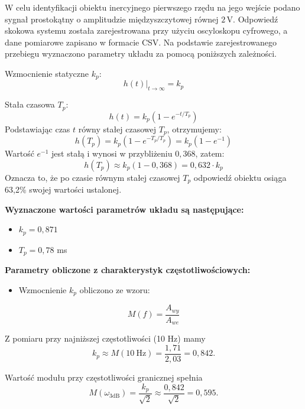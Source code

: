 \documentclass[12pt,a4paper]{article}
\begin{document}
	W celu identyfikacji obiektu inercyjnego pierwszego rzędu na jego wejście podano sygnał prostokątny o amplitudzie międzyszczytowej równej \(2\,\text{V}\). Odpowiedź skokowa systemu została zarejestrowana przy użyciu oscyloskopu cyfrowego, a dane pomiarowe zapisano w formacie CSV. Na podstawie zarejestrowanego przebiegu wyznaczono parametry układu za pomocą poniższych zależności.
	
	Wzmocnienie statyczne \(k_p\):
	\begin{equation}
		h(t)\big|_{t \to \infty} = k_p
	\end{equation}
	
	Stała czasowa \(T_p\):
	\begin{equation}
		h(t) = k_p(1-e^{-t/T_p})
	\end{equation}
	Podstawiając czas $t$ równy stałej czasowej $T_p$, otrzymujemy:
	\begin{equation}
		h(T_p) = k_p(1-e^{-T_p/T_p}) = k_p(1-e^{-1})
	\end{equation}
	Wartość $e^{-1}$ jest stałą i wynosi w przybliżeniu $0{,}368$, zatem:
	\begin{equation}
		h(T_p) \approx k_p(1-0{,}368) = 0{,}632 \cdot k_p
	\end{equation}
	Oznacza to, że po czasie równym stałej czasowej $T_p$ odpowiedź obiektu osiąga 63,2\% swojej wartości ustalonej.
	
	\noindent \textbf{Wyznaczone wartości parametrów układu są następujące:}
	\begin{itemize}
		\item $k_p = 0{,}871$ 
		\item $T_p = 0{,}78$ ms
	\end{itemize}
	
	\noindent \textbf{Parametry obliczone z charakterystyk częstotliwościowych:}
	\begin{itemize}
		\item Wzmocnienie $k_p$ obliczono ze wzoru:
	\end{itemize}
	
	\begin{equation}
		M(f)=\frac{A_{wy}}{A_{we}}
	\end{equation}
	
	Z pomiaru przy najniższej częstotliwości (10 Hz) mamy
	\begin{equation}
		k_p \approx M(10\ \text{Hz}) = \frac{1{,}71}{2{,}03} = 0{,}842.
	\end{equation}
	
	Wartość modułu przy częstotliwości granicznej spełnia
	\begin{equation}
		M(\omega_{3\text{dB}})=\frac{k_p}{\sqrt{2}} \approx \frac{0{,}842}{\sqrt{2}} = 0{,}595.
	\end{equation}
	
\end{document}
